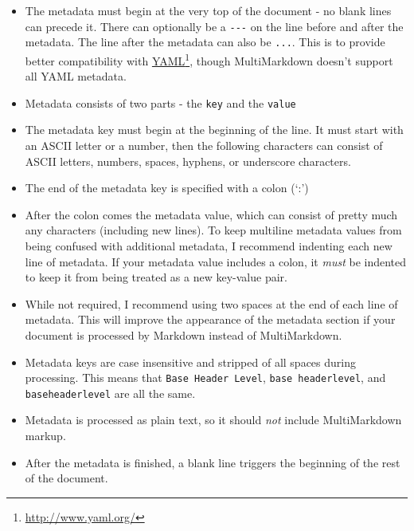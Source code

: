 \begin{itemize}
\item The metadata must begin at the very top of the document - no blank lines can precede it. There can optionally be a \texttt{-{}-{}-} on the line before and after the metadata. The line after the metadata can also be \texttt{...}. This is to provide better compatibility with \href{http://www.yaml.org/}{YAML}\footnote{\href{http://www.yaml.org/}{http:\slash \slash www.yaml.org\slash }}, though MultiMarkdown doesn't support all YAML metadata.

\item Metadata consists of two parts - the \texttt{key} and the \texttt{value}

\item The metadata key must begin at the beginning of the line. It must start with an ASCII letter or a number, then the following characters can consist of ASCII letters, numbers, spaces, hyphens, or underscore characters.

\item The end of the metadata key is specified with a colon (`:')

\item After the colon comes the metadata value, which can consist of pretty much any characters (including new lines). To keep multiline metadata values from being confused with additional metadata, I recommend indenting each new line of metadata. If your metadata value includes a colon, it \emph{must} be indented to keep it from being treated as a new key-value pair.

\item While not required, I recommend using two spaces at the end of each line of metadata. This will improve the appearance of the metadata section if your document is processed by Markdown instead of MultiMarkdown.

\item Metadata keys are case insensitive and stripped of all spaces during processing. This means that \texttt{Base Header Level}, \texttt{base headerlevel}, and \texttt{baseheaderlevel} are all the same.

\item Metadata is processed as plain text, so it should \emph{not} include MultiMarkdown markup.

\item After the metadata is finished, a blank line triggers the beginning of the rest of the document.

\end{itemize}


